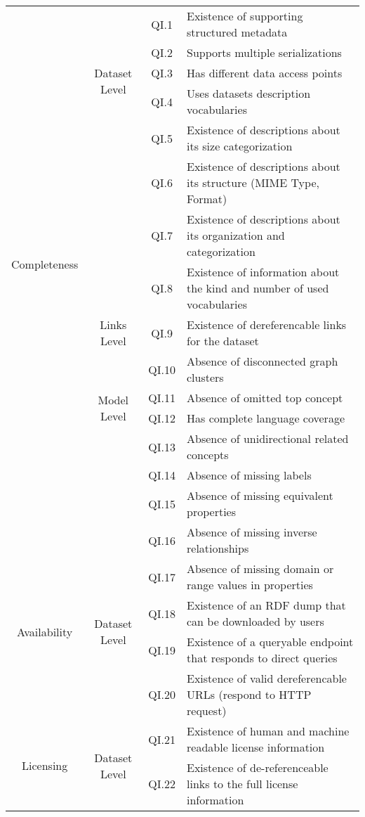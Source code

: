 \documentclass[onecolumn, crcready]{iosart2c}
\begin{document}
\begin{center}
{\begin{longtable}[h]{|c|c|c|l|}
\multirow{15}{*}{Completeness}
 & \multirow{5}{*}{Dataset Level} & QI.1 & Existence of supporting structured metadata  \cite{Hogan2010}\tabularnewline
\cline{3-4}
 &  & QI.2 & Supports multiple serializations \cite{Framework2012}\tabularnewline
\cline{3-4}
 &  & QI.3 & Has different data access points \tabularnewline
\cline{3-4}
 &  & QI.4 & Uses datasets description vocabularies \tabularnewline
\cline{3-4}
 &  & QI.5 & Existence of descriptions about its size categorization \tabularnewline
 \cline{3-4}
 &  & QI.6 & Existence of descriptions about its structure (MIME Type, Format) \tabularnewline
 \cline{3-4}
 &  & QI.7 & Existence of descriptions about its organization and categorization \tabularnewline
 \cline{3-4}
 &  & QI.8 & Existence of information about the kind and number of used vocabularies \cite{Framework2012}\tabularnewline
\cline{2-4}
 & \multirow{1}{*}{Links Level} & QI.9 & Existence of dereferencable links for the dataset \cite{Hogan2010}\cite{Mader2012}\cite{Gueret2012}\tabularnewline
\cline{2-4}
 & \multirow{4}{*}{Model Level} & QI.10 & Absence of disconnected graph clusters \cite{Mader2012}\tabularnewline
\cline{3-4}
 &  & QI.11 & Absence of omitted top concept \cite{Hogan2010}\tabularnewline
 \cline{3-4}
 &  & QI.12 & Has complete language coverage \cite{Mader2012}\tabularnewline
\cline{3-4}
 &  & QI.13 & Absence of unidirectional related concepts \cite{Hogan2010}\tabularnewline
 \cline{3-4}
 &  & QI.14 & Absence of missing labels \cite{Mader2012}\tabularnewline
 \cline{3-4}
 &  & QI.15 & Absence of missing equivalent properties \cite{DBLP:conf/ic3k/KeetSP13}\tabularnewline
 \cline{3-4}
 &  & QI.16 & Absence of missing inverse relationships \cite{DBLP:conf/ic3k/KeetSP13}\tabularnewline
 \cline{3-4}
 &  & QI.17 & Absence of missing domain or range values in properties \cite{DBLP:conf/ic3k/KeetSP13}\tabularnewline
\hline
\hline
\multirow{2}{*}{Availability} & \multirow{2}{*}{Dataset Level} & QI.18 & Existence of an RDF dump that can be downloaded by users \cite{flemming2010}\cite{Hogan2010}\tabularnewline
\cline{3-4}
 &  & QI.19 & Existence of a queryable endpoint that responds to direct queries \tabularnewline
\cline{3-4}
 &  & QI.20 & Existence of valid dereferencable URLs (respond to HTTP request) \tabularnewline
\hline
\hline
\multirow{3}{*}{Licensing} & \multirow{3}{*}{Dataset Level} & QI.21 & Existence of human and machine readable license information \cite{Hogan:2012:ESL:2263498.2264570}\tabularnewline
\cline{3-4}
 &  & QI.22 & Existence of de-referenceable links to the full license information  \cite{Hogan:2012:ESL:2263498.2264570}\tabularnewline

\end{longtable}}
\end{center}
\end{document}
